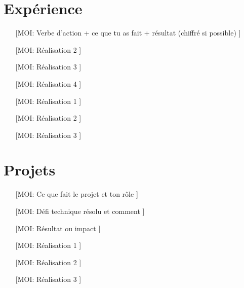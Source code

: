 \section{Expérience}

\begin{itemize}
  \item [[MOI: Verbe d'action + ce que tu as fait + résultat (chiffré si possible)]]
  \item [[MOI: Réalisation 2]]
  \item [[MOI: Réalisation 3]]
  \item [[MOI: Réalisation 4]]
\end{itemize}
\entre

\begin{itemize}
  \item [[MOI: Réalisation 1]]
  \item [[MOI: Réalisation 2]]
  \item [[MOI: Réalisation 3]]
\end{itemize}

\section{Projets}

\begin{itemize}
  \item [[MOI: Ce que fait le projet et ton rôle]]
  \item [[MOI: Défi technique résolu et comment]]
  \item [[MOI: Résultat ou impact]]
\end{itemize}
\entre

\begin{itemize}
  \item [[MOI: Réalisation 1]]
  \item [[MOI: Réalisation 2]]
  \item [[MOI: Réalisation 3]]
\end{itemize}
\entre


